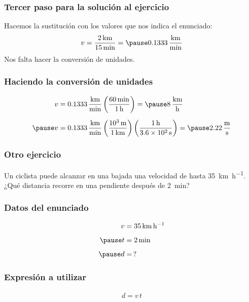 \documentclass[14pt]{beamer}
\begin{document}
\begin{frame}
\frametitle{Tercer paso para la solución al ejercicio}
Hacemos la sustitución con los valores que nos indica el enunciado:
\pause
\begin{eqnarray*}
\begin{aligned}
v = \dfrac{\SI{2}{\kilo\meter}}{\SI{15}{\minute}} = \pause \SI[per-mode=fraction]{0.1333}{\kilo\meter\per\minute}
\end{aligned}
\end{eqnarray*}
\pause
Nos falta hacer la conversión de unidades.
\end{frame}
\begin{frame}
\frametitle{Haciendo la conversión de unidades}
\begin{eqnarray*}
\begin{aligned}
v &= \SI[per-mode=fraction]{0.1333}{\kilo\meter\per\minute} \left( \dfrac{\SI{60}{\minute}}{\SI{1}{\hour}} \right) = \pause \SI[per-mode=fraction]{8}{\kilo\meter\per\hour} \\[0.5em] \pause
v &= \SI[per-mode=fraction]{0.1333}{\kilo\meter\per\minute} \left( \dfrac{\SI{d3}{\meter}}{\SI{1}{\kilo\meter}} \right) \left( \dfrac{\SI{1}{\hour}}{\SI{3.6d2}{\second}} \right)  = \pause \SI[per-mode=fraction]{2.22}{\meter\per\second}
\end{aligned}
\end{eqnarray*}
\end{frame}
\begin{frame}
\frametitle{Otro ejercicio}
Un ciclista puede alcanzar en una bajada una velocidad de hasta \SI{35}{\kilo\meter\per\hour}.
\\
\bigskip
\pause
¿Qué distancia recorre en una pendiente después de \SI{2}{\minute}?
\end{frame}
\begin{frame}
\frametitle{Datos del enunciado}
\begin{eqnarray*}
\begin{aligned}
v &= \SI{35}{\kilo\meter\per\hour} \\[0.5em] \pause
t &= \SI{2}{\minute} \\[0.5em] \pause
d &= \, ?
\end{aligned}
\end{eqnarray*}
\end{frame}
\begin{frame}
\frametitle{Expresión a utilizar}
\begin{figure}
\centering
{}
\end{figure}        
\begin{align*}
d = v \, t
\end{align*}
\end{frame}
\end{document}
